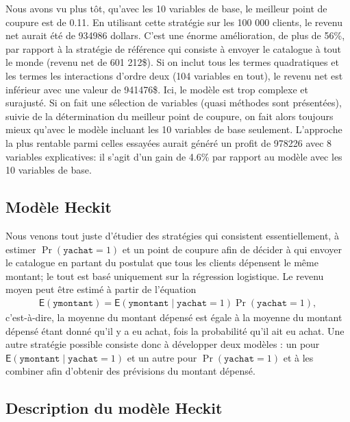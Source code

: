 \documentclass[
  11pt,
  letterpaper,
]{scrbook}
\theoremstyle{definition}
\theoremstyle{remark}
\begin{document}
Nous avons vu plus tôt, qu'avec les 10 variables de base, le meilleur
point de coupure est de 0.11. En utilisant cette stratégie sur les 100
000 clients, le revenu net aurait été de 934986 dollars. C'est une
énorme amélioration, de plus de 56\%, par rapport à la stratégie de
référence qui consiste à envoyer le catalogue à tout le monde (revenu
net de 601 212\$). Si on inclut tous les termes quadratiques et les
termes les interactions d'ordre deux (104 variables en tout), le revenu
net est inférieur avec une valeur de 941476\$. Ici, le modèle est trop
complexe et surajusté. Si on fait une sélection de variables (quasi
méthodes sont présentées), suivie de la détermination du meilleur point
de coupure, on fait alors toujours mieux qu'avec le modèle incluant les
10 variables de base seulement. L'approche la plus rentable parmi celles
essayées aurait généré un profit de 978226 avec 8 variables
explicatives: il s'agit d'un gain de 4.6\% par rapport au modèle avec
les 10 variables de base.

\hypertarget{moduxe8le-heckit}{%
\subsection{Modèle Heckit}\label{moduxe8le-heckit}}

Nous venons tout juste d'étudier des stratégies qui consistent
essentiellement, à estimer \(\Pr(\texttt{yachat}=1)\) et un point de
coupure afin de décider à qui envoyer le catalogue en partant du
postulat que tous les clients dépensent le même montant; le tout est
basé uniquement sur la régression logistique. Le revenu moyen peut être
estimé à partir de l'équation \begin{align*}
\mathsf{E}(\texttt{ymontant}) = \mathsf{E}(\texttt{ymontant} \mid \texttt{yachat}=1) \Pr(\texttt{yachat
}=1),
\end{align*} c'est-à-dire, la moyenne du montant dépensé est égale à la
moyenne du montant dépensé étant donné qu'il y a eu achat, fois la
probabilité qu'il ait eu achat. Une autre stratégie possible consiste
donc à développer deux modèles : un pour
\(\mathsf{E}(\texttt{ymontant} \mid \texttt{yachat}=1)\) et un autre
pour \(\Pr(\texttt{yachat}=1)\) et à les combiner afin d'obtenir des
prévisions du montant dépensé.

\hypertarget{description-du-moduxe8le-heckit}{%
\subsection*{Description du modèle
Heckit}\label{description-du-moduxe8le-heckit}}
\end{document}
